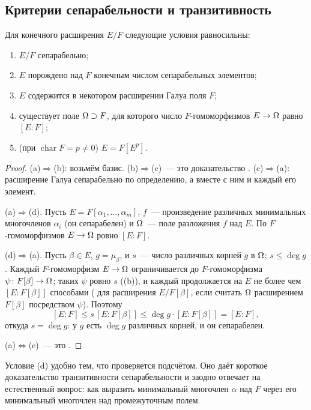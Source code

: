 \subsection*{Критерии сепарабельности и транзитивность}

\begin{proposition}[3.15b]
Для конечного расширения $E/F$ следующие условия равносильны:
\begin{enumerate}[label=\textup{(\alph*)}]
\item $E/F$ сепарабельно;
\item $E$ порождено над $F$ конечным числом сепарабельных элементов;
\item $E$ содержится в некотором расширении Галуа поля $F$;
\item существует поле $\Omega\supset F$, для которого число $F$-гомоморфизмов $E\to\Omega$ равно $[E:F]$;
\item \textup{(}при $\operatorname{char}F=p\ne0$\textup{)} $E=F[E^p]$.
\end{enumerate}
\end{proposition}

\begin{proof}
(a)$\Rightarrow$(b): возьмём базис. (b)$\Rightarrow$(c)~--- это доказательство . (c)$\Rightarrow$(a): расширение
Галуа сепарабельно по определению, а вместе с ним и каждый его элемент.

(a)$\Rightarrow$(d). Пусть $E=F[\alpha_1,\dots,\alpha_m]$, $f$~--- произведение различных минимальных многочленов $\alpha_i$ (он
сепарабелен) и $\Omega$~--- поле разложения $f$ над $E$. По  $F$-гомоморфизмов $E\to\Omega$ ровно $[E:F]$.

(d)$\Rightarrow$(a). Пусть $\beta\in E$, $g=\mu_\beta$, и $s$~--- число различных корней $g$ в $\Omega$; $s\le\deg g$. Каждый
$F$-гомоморфизм $E\to\Omega$ ограничивается до $F$-гомоморфизма $\psi\colon F[\beta]\to\Omega$; таких $\psi$ ровно $s$ ((b)), и
каждый продолжается на $E$ не более чем $[E:F[\beta]]$ способами ( для расширения $E/F[\beta]$, если считать $\Omega$
расширением $F[\beta]$ посредством $\psi$). Поэтому
\[
[E:F]\le s\,[E:F[\beta]]\le\deg g\cdot[E:F[\beta]]=[E:F],
\]
откуда $s=\deg g$: у $g$ есть $\deg g$ различных корней, и он сепарабелен.

(a)$\Leftrightarrow$(e)~--- это .
\end{proof}

Условие (d) удобно тем, что проверяется подсчётом. Оно даёт короткое доказательство транзитивности сепарабельности и
заодно отвечает на естественный вопрос: как выразить минимальный многочлен $\alpha$ над $F$ через его минимальный
многочлен над промежуточным полем.

